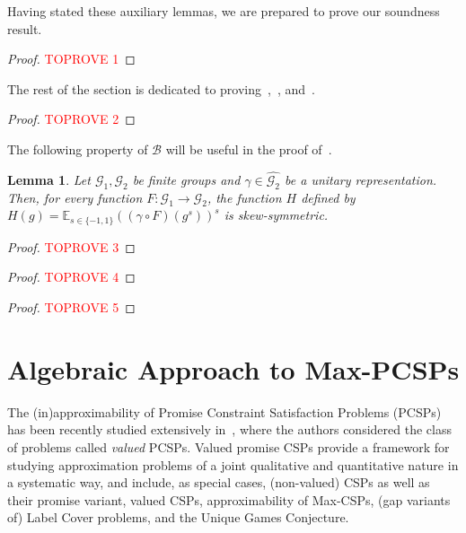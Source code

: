 \documentclass[a4paper,11pt]{article}
\newtheorem{lemma}[theorem]{Lemma}
\theoremstyle{definition}
\newcommand{\ex}[1]{\mathbb{E}_{#1}}
\newcommand{\gr}{\mathscr{G}}
\newcommand{\B}{\mathcal{B}}
\begin{document}
Having stated these auxiliary lemmas, we are prepared to prove our soundness result. 

\begin{proof}\textcolor{red}{TOPROVE 1}\end{proof}

The rest of the section is dedicated to proving~,~, and~.

\begin{proof}\textcolor{red}{TOPROVE 2}\end{proof}

The following property of $\B$ will be useful in the proof of~.

\begin{lemma} \label{le:EHR-15}
    Let $\gr_1,\gr_2$ be finite groups and $\gamma \in \widehat{\gr_2}$ be a unitary representation. Then, for every function $F:\gr_1 \to \gr_2$, the function $H$ defined by $H(g) = \ex{s\in\{-1,1\}}( (\gamma\circ F)(g^s))^s$ is skew-symmetric. 
\end{lemma}
\begin{proof}\textcolor{red}{TOPROVE 3}\end{proof}


\begin{proof}\textcolor{red}{TOPROVE 4}\end{proof}


\begin{proof}\textcolor{red}{TOPROVE 5}\end{proof}

\section{Algebraic Approach to Max-PCSPs} \label{sec:algebraic-approach}

The (in)approximability of Promise Constraint Satisfaction Problems (PCSPs) has
been recently studied extensively in~\cite{Barto24:lics}, where the authors
considered the class of problems called \emph{valued} PCSPs. 
Valued promise CSPs provide a framework for studying approximation problems of a joint
qualitative and quantitative nature in a systematic way, and include, as special
cases, (non-valued) CSPs as well as their promise variant,
valued CSPs, approximability of Max-CSPs, (gap variants of) Label Cover problems, and the Unique Games Conjecture. 
\end{document}
